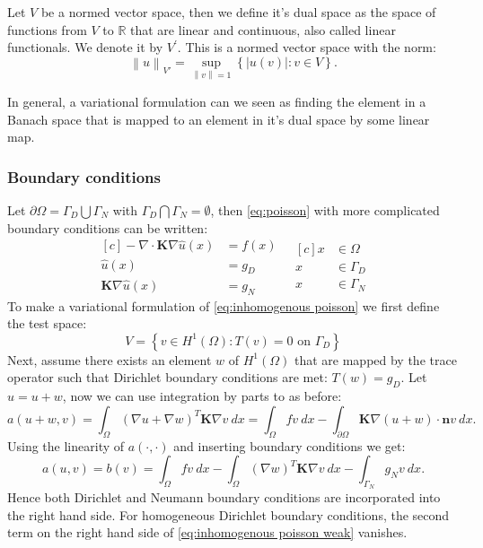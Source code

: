 \documentclass[../Main/main.tex]{subfiles}
\begin{document}
	\begin{definition}
		Let $V$ be a normed vector space, then we define it's dual space as the space of functions from $V$ to $\mathbb{R}$ that are linear and continuous, also called linear functionals. We denote it by $V^{'}$. This is a normed vector space with the norm: \begin{equation*}
\left \| u \right \|_{V'} = \sup_{\left \| v \right \|=1}\left \{ |u(v)|:v\in V \right \}. 		\end{equation*}
	\end{definition}
	In general, a variational formulation can we seen as finding the element in a Banach space that is mapped to an element in it's dual space by some linear map.
	\subsubsection*{Boundary conditions}
	Let $\partial \Omega = \Gamma_D\bigcup \Gamma_N$ with $\Gamma_D \bigcap \Gamma_N = \emptyset$, then \eqref{eq:poisson} with more complicated boundary conditions can be written:
	\begin{equation}\label{eq:inhomogenous poisson}
		\begin{aligned}[c]
			 - \nabla \cdot \bm{K} \nabla \hat{u}(x) &= f(x) \\
			\hat{u}(x) &= g_D \\
			\bm{K}\nabla \hat{u}(x) &= g_N
		\end{aligned}
		\ \ \
		\begin{aligned}[c]
			x &\in \Omega  \\
			x &\in \Gamma_D \\
			x &\in \Gamma_N
		\end{aligned}
	\end{equation}
	To make a variational formulation of \eqref{eq:inhomogenous poisson} we first define the test space:
	\begin{equation*}
		V = \left \{ v\in H^1(\Omega): T(v)=0 \text{ on }\Gamma_D\right \}
	\end{equation*}
	Next, assume there exists an element $w$ of $ H^1(\Omega)$ that are mapped by the trace operator such that Dirichlet boundary conditions are met: $T(w)=g_D$. Let $\hat{u} = u+w$, now we can use integration by parts to as before:
	\begin{equation}
		a(u+w,v) = \int_{\Omega}(\nabla u+\nabla w)^{T}\bm{K} \nabla v \ dx = \int_{\Omega}fv \ dx -\int_{\partial\Omega}\bm{K}\nabla (u+w)\cdot \bm{n}v \ dx .
	\end{equation}
	Using the linearity of $a(\cdot,\cdot)$ and inserting boundary conditions we get:
	\begin{equation}\label{eq:inhomogenous poisson weak}
		a(u,v) = b(v)= \int_{\Omega} fv \ dx - \int_{\Omega}(\nabla w)^T\bm{K} \nabla v \ dx - \int_{\Gamma_N} g_N v \ dx.
	\end{equation}
	Hence both Dirichlet and Neumann boundary conditions are incorporated into the right hand side. For homogeneous Dirichlet boundary conditions, the second term on the right hand side of \eqref{eq:inhomogenous poisson weak} vanishes. 
	
\end{document}
